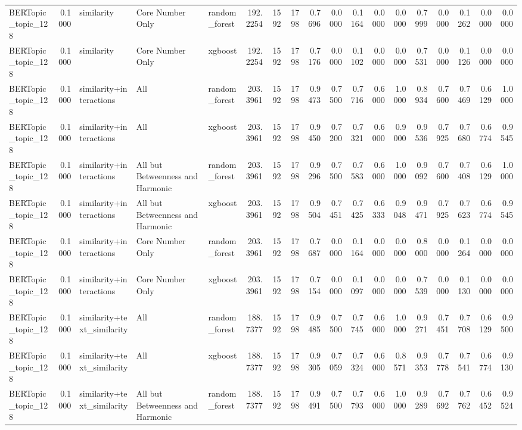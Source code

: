 \begin{tabular}{lrlllrrrrrrrrrrrrr}
BERTopic_topic_128 & 0.1000 & similarity & Core Number Only & random_forest & 192.2254 & 1592 & 1798 & 0.7696 & 0.0000 & 0.1164 & 0.0000 & 0.0000 & 0.7999 & 0.0000 & 0.1262 & 0.0000 & 0.0000 \\
BERTopic_topic_128 & 0.1000 & similarity & Core Number Only & xgboost & 192.2254 & 1592 & 1798 & 0.7176 & 0.0000 & 0.1102 & 0.0000 & 0.0000 & 0.7531 & 0.0000 & 0.1126 & 0.0000 & 0.0000 \\
BERTopic_topic_128 & 0.1000 & similarity+interactions & All & random_forest & 203.3961 & 1592 & 1798 & 0.9473 & 0.7500 & 0.7716 & 0.6000 & 1.0000 & 0.8934 & 0.7600 & 0.7469 & 0.6129 & 1.0000 \\
BERTopic_topic_128 & 0.1000 & similarity+interactions & All & xgboost & 203.3961 & 1592 & 1798 & 0.9450 & 0.7200 & 0.7321 & 0.6000 & 0.9000 & 0.9536 & 0.7925 & 0.7680 & 0.6774 & 0.9545 \\
BERTopic_topic_128 & 0.1000 & similarity+interactions & All but Betweenness and Harmonic & random_forest & 203.3961 & 1592 & 1798 & 0.9296 & 0.7500 & 0.7583 & 0.6000 & 1.0000 & 0.9092 & 0.7600 & 0.7408 & 0.6129 & 1.0000 \\
BERTopic_topic_128 & 0.1000 & similarity+interactions & All but Betweenness and Harmonic & xgboost & 203.3961 & 1592 & 1798 & 0.9504 & 0.7451 & 0.7425 & 0.6333 & 0.9048 & 0.9471 & 0.7925 & 0.7623 & 0.6774 & 0.9545 \\
BERTopic_topic_128 & 0.1000 & similarity+interactions & Core Number Only & random_forest & 203.3961 & 1592 & 1798 & 0.7687 & 0.0000 & 0.1164 & 0.0000 & 0.0000 & 0.8000 & 0.0000 & 0.1264 & 0.0000 & 0.0000 \\
BERTopic_topic_128 & 0.1000 & similarity+interactions & Core Number Only & xgboost & 203.3961 & 1592 & 1798 & 0.7154 & 0.0000 & 0.1097 & 0.0000 & 0.0000 & 0.7539 & 0.0000 & 0.1130 & 0.0000 & 0.0000 \\
BERTopic_topic_128 & 0.1000 & similarity+text_similarity & All & random_forest & 188.7377 & 1592 & 1798 & 0.9485 & 0.7500 & 0.7745 & 0.6000 & 1.0000 & 0.9271 & 0.7451 & 0.7708 & 0.6129 & 0.9500 \\
BERTopic_topic_128 & 0.1000 & similarity+text_similarity & All & xgboost & 188.7377 & 1592 & 1798 & 0.9305 & 0.7059 & 0.7324 & 0.6000 & 0.8571 & 0.9353 & 0.7778 & 0.7541 & 0.6774 & 0.9130 \\
BERTopic_topic_128 & 0.1000 & similarity+text_similarity & All but Betweenness and Harmonic & random_forest & 188.7377 & 1592 & 1798 & 0.9491 & 0.7500 & 0.7793 & 0.6000 & 1.0000 & 0.9289 & 0.7692 & 0.7762 & 0.6452 & 0.9524 \\

\end{tabular}
